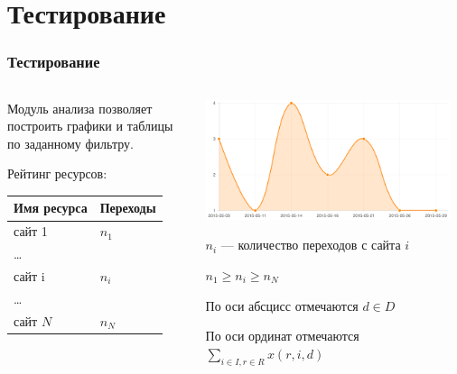 \section{Тестирование}

\begin{frame}
\frametitle{Тестирование}
\begin{columns}[T]
\begin{column}{0.30\textwidth}
Модуль анализа позволяет построить графики и таблицы по заданному фильтру.

\vspace{1.5cm}

Рейтинг ресурсов:
\begin{tabular}{|l|l|}
\hline
Имя ресурса & Переходы\\
\hline
сайт 1 & $n_1$\\
\hline
\dots & \\
\hline
сайт i & $n_i$\\
\hline
\dots & \\
\hline
сайт $N$ & $n_{N}$\\
\hline
\end{tabular}
\end{column}
\begin{column}{0.70\textwidth}
\vspace{0.2cm}
\includegraphics[width=0.95\textwidth]{images/chart}

\hspace{1cm} $n_i$ --- количество переходов с сайта $i$

\hspace{1cm} $n_1 \geq n_i \geq n_{N}$


\hspace{1cm} По оси абсцисс отмечаются $d \in D$

\hspace{1cm} По оси ординат отмечаются $\sum\limits_{i \in I, r \in R} x (r,i,d)$

\end{column}
\end{columns}
\end{frame}

